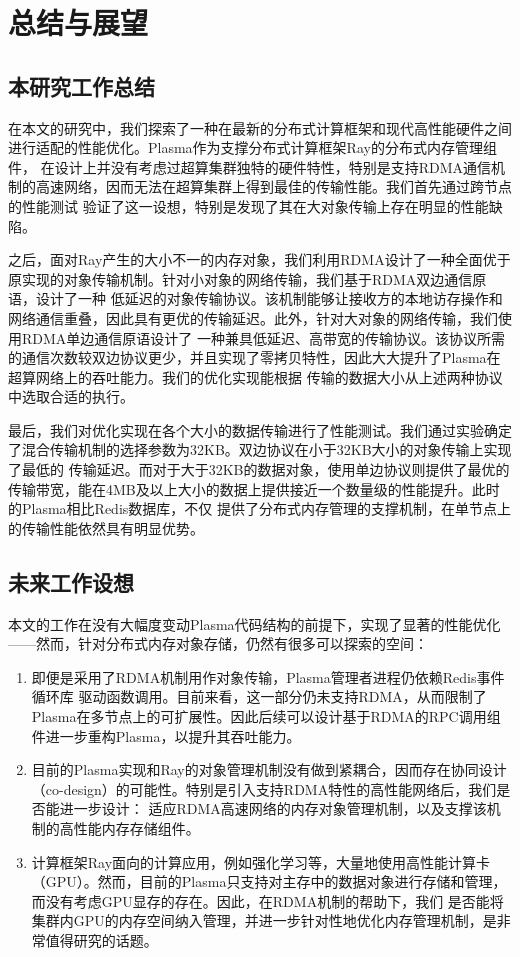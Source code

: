 \chapter{总结与展望}

\section{本研究工作总结}

在本文的研究中，我们探索了一种在最新的分布式计算框架和现代高性能硬件之间进行适配的性能优化。Plasma作为支撑分布式计算框架Ray的分布式内存管理组件，
在设计上并没有考虑过超算集群独特的硬件特性，特别是支持RDMA通信机制的高速网络，因而无法在超算集群上得到最佳的传输性能。我们首先通过跨节点的性能测试
验证了这一设想，特别是发现了其在大对象传输上存在明显的性能缺陷。

之后，面对Ray产生的大小不一的内存对象，我们利用RDMA设计了一种全面优于原实现的对象传输机制。针对小对象的网络传输，我们基于RDMA双边通信原语，设计了一种
低延迟的对象传输协议。该机制能够让接收方的本地访存操作和网络通信重叠，因此具有更优的传输延迟。此外，针对大对象的网络传输，我们使用RDMA单边通信原语设计了
一种兼具低延迟、高带宽的传输协议。该协议所需的通信次数较双边协议更少，并且实现了零拷贝特性，因此大大提升了Plasma在超算网络上的吞吐能力。我们的优化实现能根据
传输的数据大小从上述两种协议中选取合适的执行。

最后，我们对优化实现在各个大小的数据传输进行了性能测试。我们通过实验确定了混合传输机制的选择参数为32KB。双边协议在小于32KB大小的对象传输上实现了最低的
传输延迟。而对于大于32KB的数据对象，使用单边协议则提供了最优的传输带宽，能在4MB及以上大小的数据上提供接近一个数量级的性能提升。此时的Plasma相比Redis数据库，不仅
提供了分布式内存管理的支撑机制，在单节点上的传输性能依然具有明显优势。

\section{未来工作设想}

本文的工作在没有大幅度变动Plasma代码结构的前提下，实现了显著的性能优化——然而，针对分布式内存对象存储，仍然有很多可以探索的空间：

\begin{enumerate}
	\item 即便是采用了RDMA机制用作对象传输，Plasma管理者进程仍依赖Redis事件循环库\cite{ae}
	驱动函数调用。目前来看，这一部分仍未支持RDMA，从而限制了Plasma在多节点上的可扩展性。因此后续可以设计基于RDMA的RPC调用组件进一步重构Plasma，以提升其吞吐能力。
	\item 目前的Plasma实现和Ray的对象管理机制\cite{wang2021ownership}没有做到紧耦合，因而存在协同设计（co-design）的可能性。特别是引入支持RDMA特性的高性能网络后，我们是否能进一步设计：
	适应RDMA高速网络的内存对象管理机制，以及支撑该机制的高性能内存存储组件。
	\item 计算框架Ray面向的计算应用，例如强化学习等，大量地使用高性能计算卡（GPU）。然而，目前的Plasma只支持对主存中的数据对象进行存储和管理，而没有考虑GPU显存的存在。因此，在RDMA机制的帮助下，我们
	是否能将集群内GPU的内存空间纳入管理，并进一步针对性地优化内存管理机制，是非常值得研究的话题。
\end{enumerate}